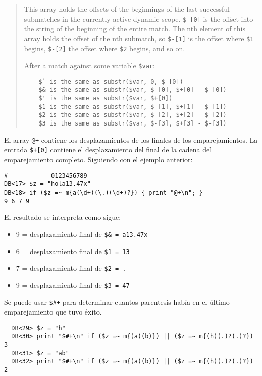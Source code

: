 \begin{it}\begin{quotation}
This array holds the offsets of the beginnings of the last successful
submatches in the currently active dynamic scope. \verb|$-[0]| is the offset
into the string of the beginning of the entire match. The nth element of
this array holds the offset of the nth submatch, so \verb|$-[1]| is the offset
where \verb|$1| begins, \verb|$-[2]| the offset where \verb|$2| begins, and so on.

    After a match against some variable \verb|$var|:

\begin{verbatim}
    $` is the same as substr($var, 0, $-[0])
    $& is the same as substr($var, $-[0], $+[0] - $-[0])
    $' is the same as substr($var, $+[0])
    $1 is the same as substr($var, $-[1], $+[1] - $-[1])
    $2 is the same as substr($var, $-[2], $+[2] - $-[2])
    $3 is the same as substr($var, $-[3], $+[3] - $-[3])
\end{verbatim}


\end{quotation}\end{it}

\label{parrafo:fincas}

El array \verb|@+| contiene los desplazamientos de 
los finales de los emparejamientos.
La entrada \verb|$+[0]| contiene el desplazamiento del final de la cadena
del emparejamiento completo.
Siguiendo con el ejemplo anterior:
\begin{verbatim}
#            0123456789
DB<17> $z = "hola13.47x"
DB<18> if ($z =~ m{a(\d+)(\.)(\d+)?}) { print "@+\n"; }
9 6 7 9
\end{verbatim}
El resultado se interpreta como sigue:
\begin{itemize}
\item 9 = desplazamiento final de \verb|$& = a13.47x| 
\item 6 = desplazamiento final de \verb|$1 = 13|
\item 7 = desplazamiento final de \verb|$2 = .|
\item 9 = desplazamiento final de \verb|$3 = 47|
\end{itemize}


Se puede usar \verb|$#+| para determinar cuantos parentesis
había en el último emparejamiento que tuvo éxito.
\begin{verbatim}
  DB<29> $z = "h"
  DB<30> print "$#+\n" if ($z =~ m{(a)(b)}) || ($z =~ m{(h)(.)?(.)?})
3
  DB<31> $z = "ab"
  DB<32> print "$#+\n" if ($z =~ m{(a)(b)}) || ($z =~ m{(h)(.)?(.)?})
2
\end{verbatim}

